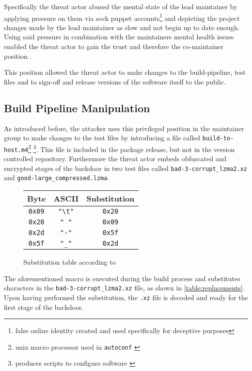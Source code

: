 Specifically the threat actor abused the mental state of the lead maintainer by
applying pressure on them via sock puppet accounts\footnote{false online
identity created and used specifically for deceptive purposes} and depicting
the project changes made by the lead maintainer as slow and not begin up to
date enough. Using said pressure in combination with the maintainers mental
health issues enabled the threat actor to gain the trust and therefore the
co-maintainer position \cite{arstechnica2024xzutils}. 

This position allowed the threat actor to make changes to the build-pipeline,
test files and to sign-off and release versions of the software itself to the
public.

\subsection{Build Pipeline Manipulation}
\label{sec:build_pipeline}

As introduced before, the attacker uses this privileged position in the
maintainer group to make changes to the test files by introducing a file
called \texttt{build-to-host.m4}\footnote{unix macro processor used in
\texttt{autoconf} \cite{gnu2021m4}} \footnote{produces scripts to configure
software \cite{gnu2020autoconf}}. This file is included in the package
release, but not in the version controlled repository. Furthermore the
threat actor embeds obfuscated and encrypted stages of the backdoor in two
test files called \texttt{bad-3-corrupt\_lzma2.xz} and
\texttt{good-large\_compressed.lzma}.

\begin{figure}[H]
    \centering
    \begin{tabular}{c c c}
        Byte & ASCII & Substitution \\
        \hline
        \texttt{0x09} & \texttt{"\textbackslash t"} & \texttt{0x20}\\
        \texttt{0x20} & \texttt{" "} & \texttt{0x09} \\
        \texttt{0x2d} & \texttt{"-"} & \texttt{0x5f} \\
        \texttt{0x5f} & \texttt{"\_"} & \texttt{0x2d} \\
    \end{tabular}
    \label{table:replacements}
    \caption{Substitution table according to \cite{arstechnica2024xzutils}}
\end{figure}

The aforementioned macro is executed during the build process and
substitutes characters in the \texttt{bad-3-corrupt\_lzma2.xz} file, as
shown in \autoref{table:replacements}. Upon having performed the
substitution, the \texttt{.xz} file is decoded and ready for the first stage
of the backdoor. 

